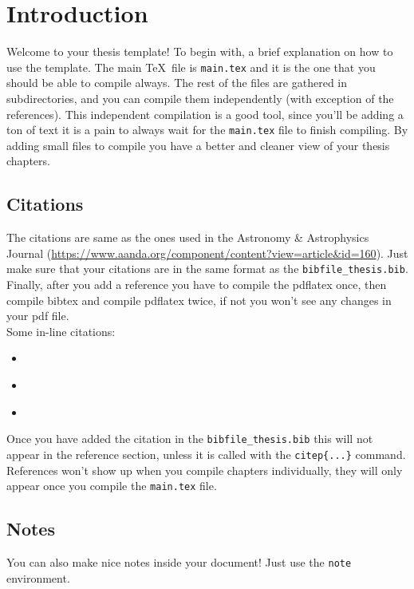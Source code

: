 \documentclass[../main/thesis_msc.tex]{subfiles}
\begin{document}
    \chapter{Introduction}

    Welcome to your thesis template! To begin with, a brief explanation on how to use the template. The main \TeX\, file is \texttt{main.tex} and it is the one that you should be able to compile always. The rest of the files are gathered in subdirectories, and you can compile them independently (with exception of the references). This independent compilation is a good tool, since you'll be adding a ton of text it is a pain to always wait for the \texttt{main.tex} file to finish compiling. By adding small files to compile you have a better and cleaner view of your thesis chapters.



    \section{Citations}
    The citations are same as the ones used in the Astronomy \& Astrophysics Journal (\url{https://www.aanda.org/component/content?view=article&id=160}). Just make sure that your citations are in the same format as the \texttt{bibfile\_thesis.bib}. Finally, after you add a reference you have to compile the pdflatex once, then compile bibtex and compile pdflatex twice, if not you won't see any changes in your pdf file. \\

    \noindent Some in-line citations:
    \begin{itemize}
        \item \citep{bracewell1978fourier}
        \item \citet{bracewell1978fourier}
        \item \citep[see][]{bracewell1978fourier}
    \end{itemize}

    Once you have added the citation in the \texttt{bibfile\_thesis.bib} this will not appear in the reference section, unless it is called with the \texttt{citep\{...\}} command. References won't show up when you compile chapters individually, they will only appear once you compile the \texttt{main.tex} file.

    \section{Notes}
    You can also make nice notes inside your document! Just use the \texttt{note} environment.
\end{document}
